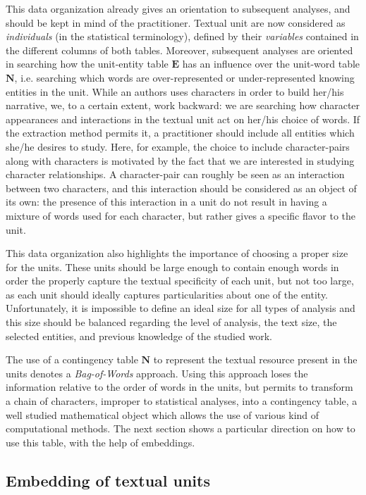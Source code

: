 \documentclass[
twocolumn,
]{ceurart}
\begin{document}
This data organization already gives an orientation to subsequent analyses, and should be kept in mind of the practitioner. Textual unit are now considered as \emph{individuals} (in the statistical terminology), defined by their \emph{variables} contained in the different columns of both tables. Moreover, subsequent analyses are oriented in searching how the unit-entity table $\mathbf{E}$ has an influence over the unit-word table $\mathbf{N}$, i.e. searching which words are over-represented or under-represented knowing entities in the unit. While an authors uses characters in order to build her/his narrative, we, to a certain extent, work backward: we are searching how character appearances and interactions in the textual unit act on her/his choice of words. If the extraction method permits it, a practitioner should include all entities which she/he desires to study. Here, for example, the choice to include character-pairs along with characters is motivated by the fact that we are interested in studying character relationships. A character-pair can roughly be seen as an interaction between two characters, and this interaction should be considered as an object of its own: the presence of this interaction in a unit do not result in having a mixture of words used for each character, but rather gives a specific flavor to the unit. 

This data organization also highlights the importance of choosing a proper size for the units. These units should be large enough to contain enough words in order the properly capture the textual specificity of each unit, but not too large, as each unit should ideally captures particularities about one of the entity. Unfortunately, it is impossible to define an ideal size for all types of analysis and this size should be balanced regarding the level of analysis, the text size, the selected entities, and previous knowledge of the studied work.

The use of a contingency table $\mathbf{N}$ to represent the textual resource present in the units denotes a \emph{Bag-of-Words} approach. Using this approach loses the information relative to the order of words in the units, but permits to transform a chain of characters, improper to statistical analyses, into a contingency table, a well studied mathematical object which allows the use of various kind of computational methods. The next section shows a particular direction on how to use this table, with the help of embeddings.

\subsection{Embedding of textual units}
\label{unit_embeddings}
\end{document}
